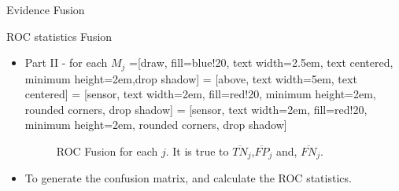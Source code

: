 \documentclass[10pt]{beamer}
\begin{document}
\begin{frame}[fragile]{Evidence Fusion}
\begin{alertblock}{ROC statistics Fusion}
\begin{itemize}
\item Part II - for each $M_j$
=[draw, fill=blue!20, text width=2.5em, 
    text centered, minimum height=2em,drop shadow]
 = [above, text width=5em, text centered]
 = [sensor, text width=2em, fill=red!20, 
    minimum height=2em, rounded corners, drop shadow]
 = [sensor, text width=2em, fill=red!20, 
    minimum height=2em, rounded corners, drop shadow]
\begin{figure}[hbt]
\caption{ROC Fusion for each $j$. It is true to $\overline{TN}_j$,$\overline{FP}_j$ and, $\overline{FN}_j$. }
\label{fig9}
\end{figure}
\item To generate the confusion matrix, and calculate the ROC statistics.
\end{itemize}
\end{alertblock}
\end{frame}
\end{document}
